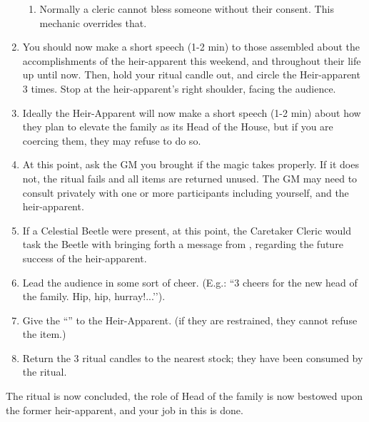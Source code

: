 \documentclass[green]{GL2020}
\begin{document}
\begin{enumerate}
    \begin{enumerate}
      \item Normally a cleric cannot bless someone without their consent. This mechanic overrides that.
    \end{enumerate}
  \item You should now make a short speech (1-2 min) to those assembled about the accomplishments of the heir-apparent this weekend, and throughout their life up until now. Then, hold your ritual candle out, and circle the Heir-apparent 3 times. Stop at the heir-apparent’s right shoulder, facing the audience.
  \item Ideally the Heir-Apparent will now make a short speech (1-2 min) about how they plan to elevate the \cFaledonParent{\formal} family as its Head of the House, but if you are coercing them, they may refuse to do so.
  \item At this point, ask the GM you brought if the magic takes properly. If it does not, the ritual fails and all items are returned unused. The GM may need to consult privately with one or more participants including yourself, and the heir-apparent.
  \item If a Celestial Beetle were present, at this point, the Caretaker Cleric would task the Beetle with bringing forth a message from \cTechGod{}, regarding the future success of the heir-apparent.
  \item Lead the audience in some sort of cheer. (E.g.: ``3 cheers for the new head of the \cFaledonParent{\formal} family. Hip, hip, hurray!...’’).
  \item Give the ``\iFaledonRing{}'' to the Heir-Apparent. (if they are restrained, they cannot refuse the item.)
  \item Return the 3 ritual candles to the nearest stock; they have been consumed  by the ritual.
\end{enumerate}

The ritual is now concluded, the role of Head of the \cFaledonParent{\formal} family is now bestowed upon the former heir-apparent, and your job in this is done.
\end{document}
